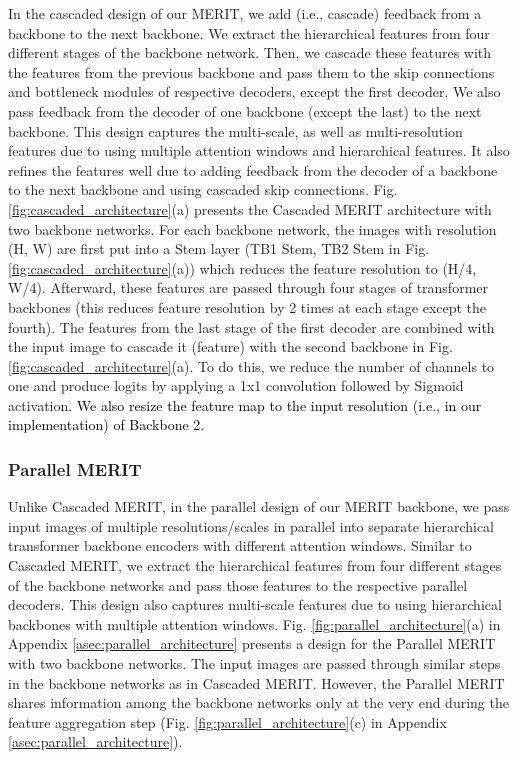 \documentclass{midl}
\begin{document}
In the cascaded design of our MERIT, we add (i.e., cascade) feedback from a backbone to the next backbone. We extract the hierarchical features from four different stages of the backbone network. Then, we cascade these features with the features from the previous backbone and pass them to the skip connections and bottleneck modules of respective decoders, except the first decoder. We also pass feedback from the decoder of one backbone (except the last) to the next backbone. This design captures the multi-scale, as well as multi-resolution features due to using multiple attention windows and hierarchical features. It also refines the features well due to adding feedback from the decoder of a backbone to the next backbone and using cascaded skip connections. Fig. \ref{fig:cascaded_architecture}(a) presents the Cascaded MERIT architecture with two backbone networks. For each backbone network, the images with resolution (H, W) are first put into a Stem layer (TB1 Stem, TB2 Stem in Fig. \ref{fig:cascaded_architecture}(a)) which reduces the feature resolution to (H/4, W/4). Afterward, these features are passed through four stages of transformer backbones (this reduces feature resolution by 2 times at each stage except the fourth). The features from the last stage of the first decoder are combined with the input image to cascade it (feature) with the second backbone in Fig. \ref{fig:cascaded_architecture}(a). To do this, we reduce the number of channels to one and produce logits by applying a 1x1 convolution followed by Sigmoid activation. \textcolor{black}{We also resize the feature map to the input resolution (i.e.,  in our implementation) of Backbone 2.}

\subsubsection{Parallel MERIT}
\label{ssec:parallel_merit}

Unlike Cascaded MERIT, in the parallel design of our MERIT backbone, we pass input images of multiple resolutions/scales in parallel into separate hierarchical transformer backbone encoders with different attention windows. Similar to Cascaded MERIT, we extract the hierarchical features from four different stages of the backbone networks and pass those features to the respective parallel decoders. This design also captures multi-scale features due to using hierarchical backbones with multiple attention windows. Fig. \ref{fig:parallel_architecture}(a) in Appendix \ref{asec:parallel_architecture} presents a design for the Parallel MERIT with two backbone networks. The input images are passed through similar steps in the backbone networks as in Cascaded MERIT. However, the Parallel MERIT shares information among the backbone networks only at the very end during the feature aggregation step (Fig. \ref{fig:parallel_architecture}(c) in Appendix \ref{asec:parallel_architecture}).  
\end{document}
